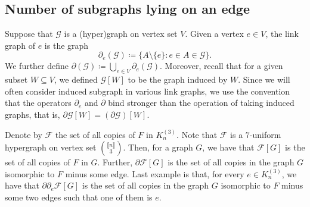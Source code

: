 \documentclass[11pt,a4paper,oneside,reqno]{amsart}
\newcommand{\Gnp}{G_{n, p}^{(3)}}
\newcommand{\cF}{\mathcal{F}}
\newcommand{\cG}{\mathcal{G}}
\renewcommand{\Pr}{\mathbb{P}}
\newcommand{\1}{\mathbbm{1}} %
\newcommand{\br}[1]{\llbracket{#1}\rrbracket}
\renewcommand{\le}{\leqslant}
\renewcommand{\ge}{\geqslant}
\newcommand{\ext}{\mathrm{ext}}
\renewcommand{\int}{\mathrm{int}}
\begin{document}

\subsection{Number of subgraphs lying on an edge}

Suppose that $\cG$ is a (hyper)graph on vertex set $V$. Given a vertex $e \in V$, the link graph of $e$ is the graph
\[
    \partial_e(\cG) \coloneqq \{A \setminus \{e\} \colon e \in A \in \cG\}.
\]
We further define $\partial(\cG) \coloneqq \bigcup_{e \in V} \partial_e(\cG)$. 
Moreover, recall that for a given subset $W \subseteq V$, we defined $\cG[W]$ to be the graph induced by $W$. Since we will often consider induced subgraph in various link graphs, we use the convention that the operators $\partial_e$ and $\partial$ bind stronger than the operation of taking induced graphs, that is, $\partial \cG[W] = (\partial \cG)[W]$.

Denote by $\cF$ the set of all copies of $F$ in $K_n^{(3)}$. Note that $\cF$ is a $7$-uniform hypergraph on vertex set $\binom{\br{n}}{3}$. Then, for a graph $G$, we have that $\cF[G]$ is the set of all copies of $F$ in $G$. Further, $\partial \cF[G]$ is the set of all copies in the graph $G$ isomorphic to $F$ minus some edge. Last example is that, for every $e \in K_n^{(3)}$, we have that $\partial \partial_e \cF[G]$ is the set of all copies in the graph $G$ isomorphic to $F$ minus some two edges such that one of them is $e$. 
\end{document}
